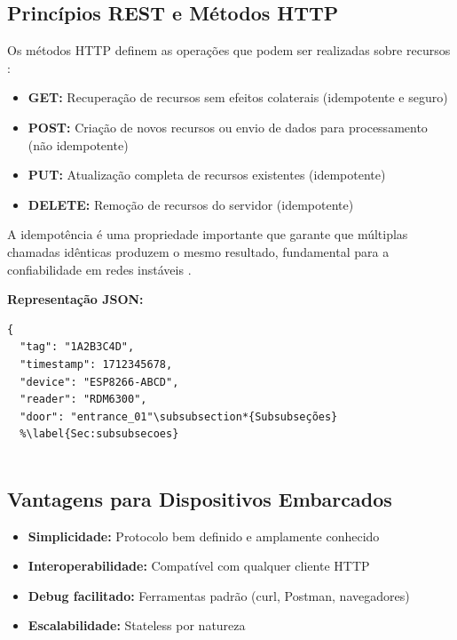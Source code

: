 \subsection{Princípios REST e Métodos HTTP}

Os métodos HTTP definem as operações que podem ser realizadas sobre recursos \cite{mdn-http-methods}:

\begin{itemize}
\item \textbf{GET:} Recuperação de recursos sem efeitos colaterais (idempotente e seguro)
\item \textbf{POST:} Criação de novos recursos ou envio de dados para processamento (não idempotente)
\item \textbf{PUT:} Atualização completa de recursos existentes (idempotente)
\item \textbf{DELETE:} Remoção de recursos do servidor (idempotente)
\end{itemize}

A idempotência é uma propriedade importante que garante que múltiplas chamadas idênticas produzem o mesmo resultado, fundamental para a confiabilidade em redes instáveis \cite{restful-api-tutorial}.

\textbf{Representação JSON:}
\begin{verbatim}
{
  "tag": "1A2B3C4D",
  "timestamp": 1712345678,
  "device": "ESP8266-ABCD",
  "reader": "RDM6300",
  "door": "entrance_01"\subsubsection*{Subsubseções}
  %\label{Sec:subsubsecoes}
  
\end{verbatim}

\subsection{Vantagens para Dispositivos Embarcados}

\begin{itemize}
\item \textbf{Simplicidade:} Protocolo bem definido e amplamente conhecido
\item \textbf{Interoperabilidade:} Compatível com qualquer cliente HTTP
\item \textbf{Debug facilitado:} Ferramentas padrão (curl, Postman, navegadores)
\item \textbf{Escalabilidade:} Stateless por natureza
\end{itemize}

